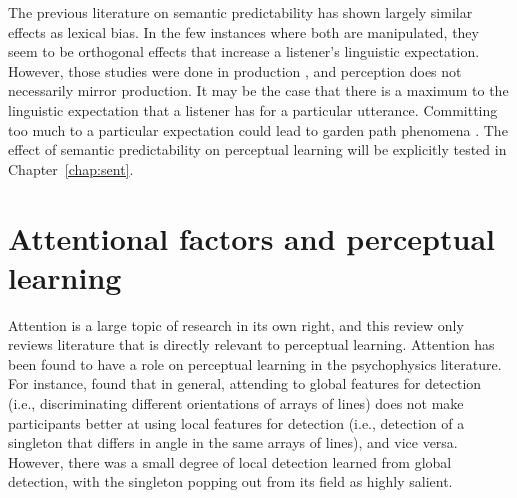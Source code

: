 The previous literature on semantic predictability has shown largely similar effects as lexical bias.  In the few instances where both are manipulated, they seem to be orthogonal effects that increase a listener's linguistic expectation.  However, those studies were done in production \citep{Scarborough2010, Clopper2008}, and perception does not necessarily mirror production.  It may be the case that there is a maximum to the linguistic expectation that a listener has for a particular utterance.  Committing too much to a particular expectation could lead to garden path phenomena \citep{Levy2008}.  The effect of semantic predictability on perceptual learning will be explicitly tested in Chapter~\ref{chap:sent}.

\section{Attentional factors and perceptual learning}
\label{sec:attention}

Attention is a large topic of research in its own right, and this review only reviews literature that is directly relevant to perceptual learning.
Attention has been found to have a role on perceptual learning in the psychophysics literature.  
For instance, \citet{Ahissar1993} found that in general, attending to global features for detection (i.e., discriminating different orientations of arrays of lines) does not make participants better at using local features for detection (i.e., detection of a singleton that differs in angle in the same arrays of lines), and vice versa.  However, there was a small degree of local detection learned from global detection, with the singleton popping out from its field as highly salient.

